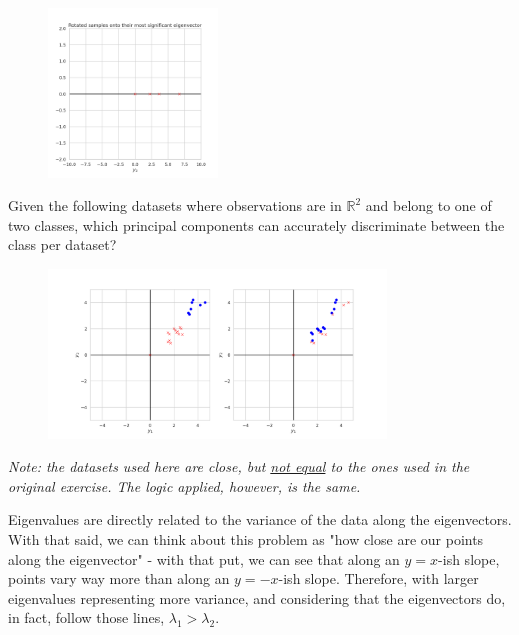 \documentclass[12pt]{article}
\begin{document}
\begin{enumerate}[leftmargin=\labelsep]
  \begin{figure}[H]
    \centering
    \includegraphics[width=0.4\textwidth]{assets/ex-1/kl-transform-1d.png}
    \label{fig:kl-transform-1d}
  \end{figure}

  \begin{tcolorbox}[enhanced jigsaw,halign=center,colback=bg,boxrule=0pt,arc=1pt]
    \item Given the following datasets where observations are in $\mathbb{R}^2$ and belong
    to one of two classes, which principal components can accurately discriminate
    between the class per dataset?
  \end{tcolorbox}

  \begin{figure}[h]
    \centering
    \includegraphics[width=0.8\textwidth]{assets/ex-2/samples.png}
    \label{fig:samples-2}
  \end{figure}

  \textit{Note: the datasets used here are close, but \underline{not equal} to
    the ones used in the original exercise. The logic applied, however, is the same.}

  Eigenvalues are directly related to the variance of the data along the eigenvectors.
  With that said, we can think about this problem as "how close are our points along
  the eigenvector" - with that put, we can see that along an $y=x$-ish slope, points
  vary way more than along an $y=-x$-ish slope. Therefore, with larger
  eigenvalues representing more variance, and considering that the eigenvectors
  do, in fact, follow those lines, $\lambda_1 > \lambda_2$.


\end{enumerate}
\end{document}
